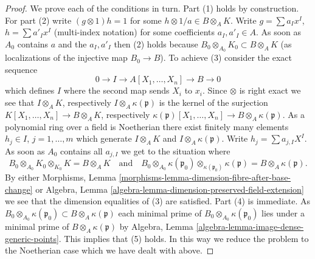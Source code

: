 \begin{proof}
\medskip\noindent
We prove each of the conditions in turn. Part (1) holds by construction.
For part (2) write $(g \otimes 1) h = 1$ for some
$h \otimes 1/a \in B \otimes_A K$. Write
$g = \sum a_I x^I$, $h = \sum a'_I x^I$ (multi-index notation)
for some coefficients $a_I, a'_I \in A$. As soon as $A_0$ contains
$a$ and the $a_I, a'_I$ then (2) holds because
$B_0 \otimes_{A_0} K_0 \subset B \otimes_A K$ (as localizations of the
injective map $B_0 \to B$).
To achieve (3) consider the exact sequence
$$
0 \to I \to A[X_1, \ldots, X_n] \to B \to 0
$$
which defines $I$ where the second map sends $X_i$ to $x_i$. Since $\otimes$
is right exact we see that $I \otimes_A K$, respectively
$I \otimes_A \kappa(\mathfrak p)$ is the kernel of the surjection
$K[X_1, \ldots, X_n] \to B \otimes_A K$, respectively
$\kappa(\mathfrak p)[X_1, \ldots, X_n] \to B \otimes_A \kappa(\mathfrak p)$.
As a polynomial ring over a field is Noetherian
there exist finitely many elements $h_j \in I$, $j = 1, \ldots, m$
which generate $I \otimes_A K$ and $I \otimes_A \kappa(\mathfrak p)$.
Write $h_j = \sum a_{j, I}X^I$. As soon as
$A_0$ contains all $a_{j, I}$ we get to the situation where
$$
B_0 \otimes_{A_0} K_0 \otimes_{K_0} K = B \otimes_A K
\quad\text{and}\quad
B_0 \otimes_{A_0} \kappa(\mathfrak p_0)
\otimes_{\kappa(\mathfrak p_0)} \kappa(\mathfrak p)
=
B \otimes_A \kappa(\mathfrak p).
$$
By either
Morphisms, Lemma \ref{morphisms-lemma-dimension-fibre-after-base-change}
or
Algebra, Lemma \ref{algebra-lemma-dimension-preserved-field-extension}
we see that the dimension equalities of (3) are satisfied.
Part (4) is immediate. As
$B_0 \otimes_{A_0} \kappa(\mathfrak p_0) \subset
B \otimes_A \kappa(\mathfrak p)$ each minimal prime of
$B_0 \otimes_{A_0} \kappa(\mathfrak p_0)$ lies under a minimal
prime of $B \otimes_A \kappa(\mathfrak p)$ by
Algebra, Lemma \ref{algebra-lemma-image-dense-generic-points}.
This implies that (5) holds.
In this way we reduce the problem to the Noetherian case which we
have dealt with above.
\end{proof}